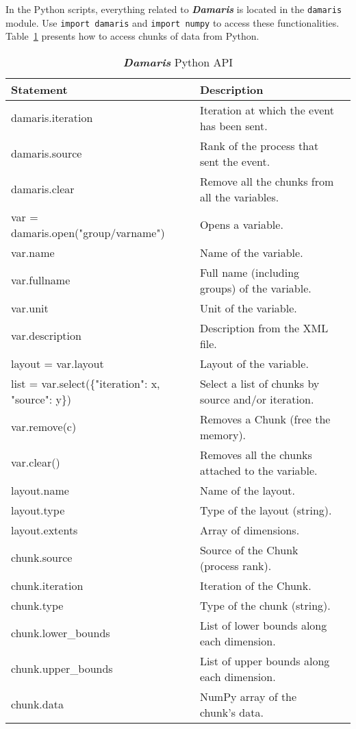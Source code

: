 \documentclass[11pt]{report}
\newcommand{\Damaris}{\emph{\textbf{Damaris}}}
\begin{document}
In the Python scripts, everything related to \Damaris{} is located in the \texttt{damaris} module. 
Use \texttt{import damaris} and \texttt{import numpy} to access these functionalities.
Table~\ref{tab:pythonAPI} presents how to access chunks of data from Python.

\begin{table}[h]
\centering{}
   \begin{tabular}{|l|l|l|}
       \hline
       Statement & Description \\
       \hline
       \hline
       damaris.iteration & Iteration at which the event has been sent. \\
       damaris.source & Rank of the process that sent the event.\\
       damaris.clear & Remove all the chunks from all the variables. \\
       var = damaris.open("group/varname") & Opens a variable.\\
       var.name & Name of the variable.\\
       var.fullname & Full name (including groups) of the variable.\\
       var.unit & Unit of the variable.\\
       var.description & Description from the XML file. \\
       layout = var.layout & Layout of the variable.\\
       list = var.select(\{"iteration": x, "source": y\}) & Select a list of chunks by source and/or iteration.\\
       var.remove(c) & Removes a Chunk (free the memory). \\
       var.clear() & Removes all the chunks attached to the variable. \\
       layout.name & Name of the layout. \\
       layout.type & Type of the layout (string). \\
       layout.extents & Array of dimensions. \\
       chunk.source & Source of the Chunk (process rank). \\
       chunk.iteration & Iteration of the Chunk. \\
       chunk.type & Type of the chunk (string). \\
       chunk.lower\_bounds & List of lower bounds along each dimension. \\
       chunk.upper\_bounds & List of upper bounds along each dimension. \\
       chunk.data & NumPy array of the chunk's data. \\
       \hline
   \end{tabular}\caption{\Damaris{} Python API}\label{tab:pythonAPI}
\end{table}
\end{document}
